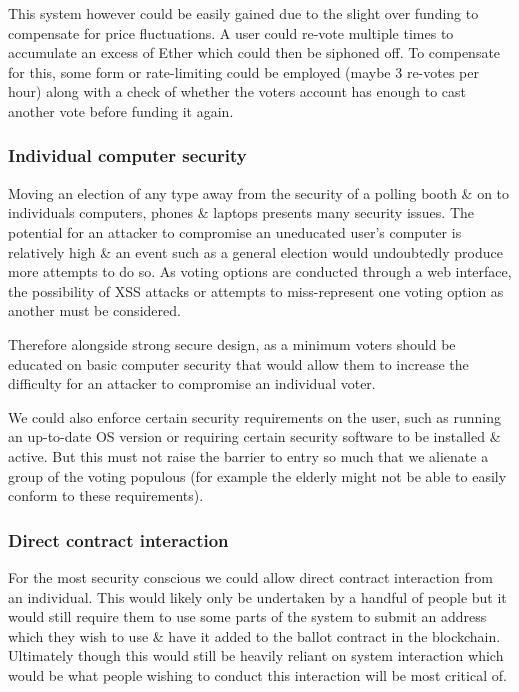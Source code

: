 \documentclass{article}
\begin{document}
	This system however could be easily gained due to the slight over funding to compensate for price fluctuations. A user could re-vote multiple times to accumulate an excess of Ether which could then be siphoned off. To compensate for this, some form or rate-limiting could be employed (maybe 3 re-votes per hour) along with a check of whether the voters account has enough to cast another vote before funding it again.
	
	\subsubsection{Individual computer security}
	Moving an election of any type away from the security of a polling booth \& on to individuals computers, phones \& laptops presents many security issues. The potential for an attacker to compromise an uneducated user's computer is relatively high \& an event such as a general election would undoubtedly produce more attempts to do so.	As voting options are conducted through a web interface, the possibility of XSS attacks or attempts to miss-represent one voting option as another must be considered.
	
	Therefore alongside strong secure design, as a minimum voters should be educated on basic computer security that would allow them to increase the difficulty for an attacker to compromise an individual voter.	
	
	We could also enforce certain security requirements on the user, such as running an up-to-date OS version or requiring certain security software to be installed \& active. But this must not raise the barrier to entry so much that we alienate a group of the voting populous (for example the elderly might not be able to easily conform to these requirements).
	
	\subsubsection{Direct contract interaction}
	For the most security conscious we could allow direct contract interaction from an individual. This would likely only be undertaken by a handful of people but it would still require them to use some parts of the system to submit an address which they wish to use \& have it added to the ballot contract in the blockchain. Ultimately though this would still be heavily reliant on system interaction which would be what people wishing to conduct this interaction will be most critical of.
	
\end{document}
